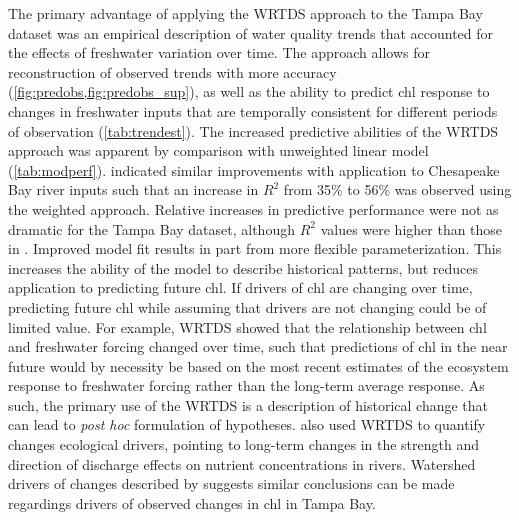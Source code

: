 \documentclass[letterpaper,12pt,oneside]{article}\usepackage[]{graphicx}\usepackage[]{color}
\begin{document}
The primary advantage of applying the \ac{WRTDS} approach to the Tampa Bay dataset was an empirical description of water quality trends that accounted for the effects of freshwater variation over time. The approach allows for reconstruction of observed trends  with more accuracy (\cref{fig:predobs,fig:predobs_sup}), as well as the ability to predict \ac{chl} response to changes in freshwater inputs that are temporally consistent for different periods of observation (\cref{tab:trendest}). The increased predictive abilities of the \ac{WRTDS} approach was apparent by comparison with unweighted linear model (\cref{tab:modperf}).  \citet{Hirsch10} indicated similar improvements with application to Chesapeake Bay river inputs such that an increase in $R^2$ from 35\% to 56\% was observed using the weighted approach.  Relative increases in predictive performance were not as dramatic for the Tampa Bay dataset, although $R^2$ values were higher than those in \citet{Hirsch10}.  Improved model fit results in part from more flexible parameterization.  This increases the ability of the model to describe historical patterns, but reduces application to predicting future \ac{chl}.  If drivers of \ac{chl} are changing over time, predicting future \ac{chl} while assuming that drivers are not changing could be of limited value.  For example, \ac{WRTDS} showed that the relationship between \ac{chl} and freshwater forcing changed over time, such that predictions of \ac{chl} in the near future would by necessity be based on the most recent estimates of the ecosystem response to freshwater forcing rather than the long-term average response.  As such, the primary use of the \ac{WRTDS} is a description of historical change that can lead to \textit{post hoc} formulation of hypotheses.  \citet{Hirsch10} also used WRTDS to quantify changes ecological drivers, pointing to long-term changes in the strength and direction of discharge effects on nutrient concentrations in rivers.  Watershed drivers of changes described by \citet{Hirsch10} suggests similar conclusions can be made regardings drivers of observed changes in \ac{chl} in Tampa Bay.  
\end{document}
